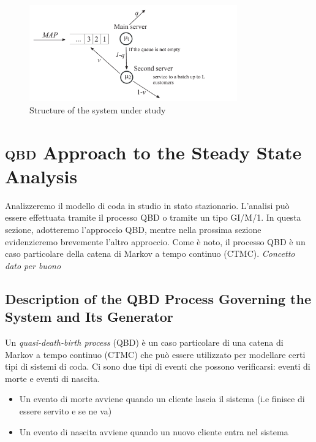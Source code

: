 \documentclass[11pt]{article}
\begin{document}
\begin{figure}[h]
    \centering
    \includegraphics[width=0.8\textwidth]{hVQg024.png}
    \caption{Structure of the system under study}
    \label{fig:diagramma_di_stato}
\end{figure}

\section{\textsc{qbd} Approach to the Steady State Analysis}

Analizzeremo il modello di coda in studio in stato stazionario. L'analisi può essere effettuata tramite il processo QBD o tramite un tipo GI/M/1. In questa sezione, adotteremo l'approccio QBD, mentre nella prossima sezione evidenzieremo brevemente l'altro approccio. Come è noto, il processo QBD è un caso particolare della catena di Markov a tempo continuo (CTMC). \emph{Concetto dato per buono}

\subsection{Description of the QBD Process Governing the System and Its Generator}

Un \emph{quasi-death-birth process} (QBD) è un caso particolare di una catena di Markov a tempo continuo (CTMC) che può essere utilizzato per modellare certi tipi di sistemi di coda. Ci sono due tipi di eventi che possono verificarsi: eventi di morte e eventi di nascita.
\begin{itemize}
    \item Un evento di morte avviene quando un cliente lascia il sistema (i.e finisce di essere servito e se ne va)
    \item Un evento di nascita avviene quando un nuovo cliente entra nel sistema
\end{itemize}
\end{document}
